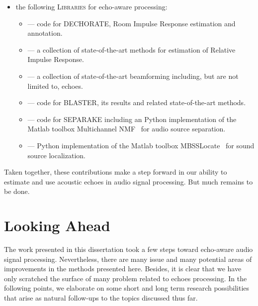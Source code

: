 \begin{itemize}
    \item the following \textsc{Libraries} for echo-aware processing:
    \begin{itemize}[label={\scriptsize\faCode}]
        \item {} --- code for \acs{DECHORATE}, Room Impulse Response estimation and annotation.
        \item {} --- a collection of state-of-the-art methods for estimation of Relative Impulse Response.
        \item {} --- a collection of state-of-the-art beamforming including, but are not limited to, echoes.
        \item {} --- code for \acs{BLASTER}, its results and related state-of-the-art methods.
        \item {} --- code for \acs{SEPARAKE} including an Python implementation of the Matlab toolbox Multichannel NMF~ for audio source separation.
        \item {} --- Python implementation of the Matlab toolbox MBSSLocate~ for sound source localization.

    \end{itemize}

\end{itemize}

\mynewline
Taken together, these contributions make a step forward in our ability to estimate and use acoustic echoes in audio signal processing.
But much remains to be done.

\section{Looking Ahead}
The work presented in this dissertation took a few steps toward echo-aware audio signal processing.
Nevertheless, there are many issue and many potential areas of improvements in the methods presented here.
Besides, it is clear that we have only scratched the surface of many problem related to echoes processing.
In the following points, we elaborate on some short and long term research possibilities that arise as natural follow-ups to the topics discussed thus far.


